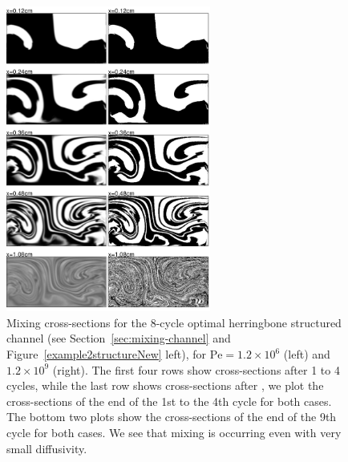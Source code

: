 \documentclass[times]{fldauth}
\begin{document}
  \begin{figure}
    \centerline{
      \includegraphics[width=0.6\textwidth]{example2simu2}
    }
    \caption{\label{example2simu} Mixing cross-sections for the
      $8$-cycle optimal herringbone structured channel (see
      Section~\ref{sec:mixing-channel} and
      Figure~\ref{example2structureNew} left), for $\text{Pe} =
      1.2\times10^6$ (left) and $1.2\times10^9$ (right). The first
      four rows show cross-sections after 1 to 4 cycles, while the
      last row shows cross-sections after , we plot the cross-sections
      of the end of the 1st to the 4th cycle for both cases. The
      bottom two plots show the cross-sections of the end of the 9th
      cycle for both cases. We see that mixing is occurring even with
      very small diffusivity.}
  \end{figure}
\end{document}
